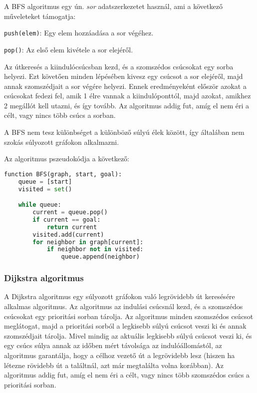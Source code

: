 A BFS algoritmus egy ún. \textit{sor} adatszerkezetet használ\cite{russell2020artificial}, ami a következő műveleteket támogatja:

\begin{compactitem}
    \item \texttt{push(elem)}: Egy elem hozzáadása a sor végéhez.
    \item \texttt{pop()}: Az első elem kivétele a sor elejéről.
\end{compactitem}

Az útkeresés a kiindulócsúcsban kezd, és a szomszédos csúcsokat egy sorba helyezi. Ezt követően minden lépésében kivesz egy csúcsot a sor elejéről, majd annak szomszédjait a sor végére helyezi. Ennek eredményeként először azokat a csúcsokat fedezi fel, amik 1 élre vannak a kiindulóponttól, majd azokat, amikhez 2 megállót kell utazni, és így tovább\cite{russell2020artificial}. Az algoritmus addig fut, amíg el nem éri a célt, vagy nincs több csúcs a sorban.

A BFS nem tesz különbséget a különböző súlyú élek között, így általában nem szokás súlyozott gráfokon alkalmazni\cite{russell2020artificial}.

Az algoritmus pszeudokódja a következő: \\

\begin{minipage}{\textwidth}
\begin{lstlisting}[language={Python}]
function BFS(graph, start, goal):
    queue = [start]
    visited = set()

    while queue:
        current = queue.pop()
        if current == goal:
            return current
        visited.add(current)
        for neighbor in graph[current]:
            if neighbor not in visited:
                queue.append(neighbor)
\end{lstlisting}
\end{minipage}

\subsubsection{Dijkstra algoritmus}

A Dijkstra algoritmus egy súlyozott gráfokon való legrövidebb út\cite{russell2020artificial} keresésére alkalmas algoritmus. Az algoritmus az indulási csúcsnál kezd, és a szomszédos csúcsokat egy prioritási sorban tárolja. Az algoritmus minden szomszédos csúcsot meglátogat, majd a prioritási sorból a legkisebb súlyú csúcsot veszi ki és annak szomszédjait tárolja. Mivel mindig az aktuális legkisebb súlyú csúcsot veszi ki, és egy csúcs súlya annak az időben mért távolsága az indulóállomástól, az algoritmus garantálja, hogy a célhoz vezető út a legrövidebb lesz (hiszen ha létezne rövidebb út a találtnál, azt már megtalálta volna korábban). Az algoritmus addig fut, amíg el nem éri a célt, vagy nincs több szomszédos csúcs a prioritási sorban.


